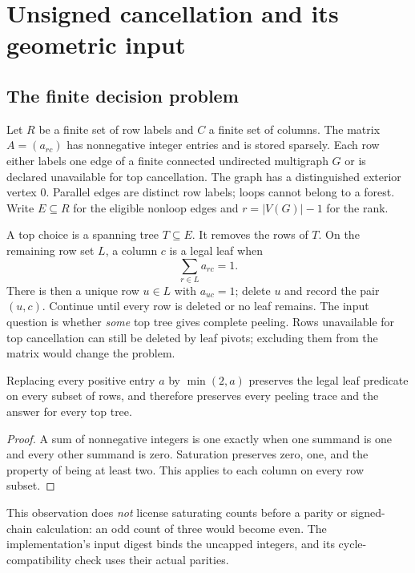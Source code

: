\section{Unsigned cancellation and its geometric input}
\label{sec:model}

\subsection{The finite decision problem}

Let $R$ be a finite set of row labels and $C$ a finite set of columns. The
matrix $A=(a_{rc})$ has nonnegative integer entries and is stored sparsely.
Each row either labels one edge of a finite connected undirected
multigraph $G$ or is declared unavailable for top cancellation. The graph
has a distinguished exterior vertex $0$. Parallel edges are distinct row
labels; loops cannot belong to a forest. Write $E\subseteq R$ for the
eligible nonloop edges and $r=|V(G)|-1$ for the rank.

A top choice is a spanning tree $T\subseteq E$. It removes the rows of
$T$. On the remaining row set $L$, a column $c$ is a legal leaf when
\[
                         \sum_{r\in L}a_{rc}=1.
\]
There is then a unique row $u\in L$ with $a_{uc}=1$; delete $u$ and
record the pair $(u,c)$. Continue until every row is deleted or no leaf
remains. The input question is whether \emph{some} top tree gives complete
peeling. Rows unavailable for top cancellation can still be deleted by
leaf pivots; excluding them from the matrix would change the problem.

\begin{lemma}
\label{lem:saturation}
Replacing every positive entry $a$ by $\min(2,a)$ preserves the legal
leaf predicate on every subset of rows, and therefore preserves every
peeling trace and the answer for every top tree.
\end{lemma}
\begin{proof}
A sum of nonnegative integers is one exactly when one summand is one and
every other summand is zero. Saturation preserves zero, one, and the
property of being at least two. This applies to each column on every
row subset.
\end{proof}

This observation does \emph{not} license saturating counts before a
parity or signed-chain calculation: an odd count of three would become
even. The implementation's input digest binds the uncapped integers,
and its cycle-compatibility check uses their actual parities.

